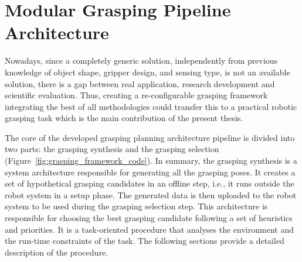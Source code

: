 \chapter{Modular Grasping Pipeline Architecture}
\label{cap4:modular_grasping_architecture}

Nowadays, since a completely generic solution, independently from previous knowledge of object shape, gripper design, and sensing type, is not an available solution, there is a gap between real application, research development and scientific evaluation. Thus, creating a re-configurable grasping framework integrating the best of all methodologies could transfer this to a practical robotic grasping task which is the main contribution of the present thesis.

The core of the developed grasping planning architecture pipeline is divided into two parts: the grasping synthesis and the grasping selection (Figure~\ref{fig:grasping_framework_code}). In summary, the grasping synthesis is a system architecture responsible for generating all the grasping poses. It creates a set of  hypothetical grasping candidates in an offline step, i.e., it runs outside the robot system in a setup phase. The generated data is then uploaded to the robot system to be used during the grasping selection step. This architecture is responsible for choosing the best grasping candidate following a set of heuristics and priorities. It is a task-oriented procedure that analyses the environment and the run-time constraints of the task. The following sections provide a detailed description of the procedure.


